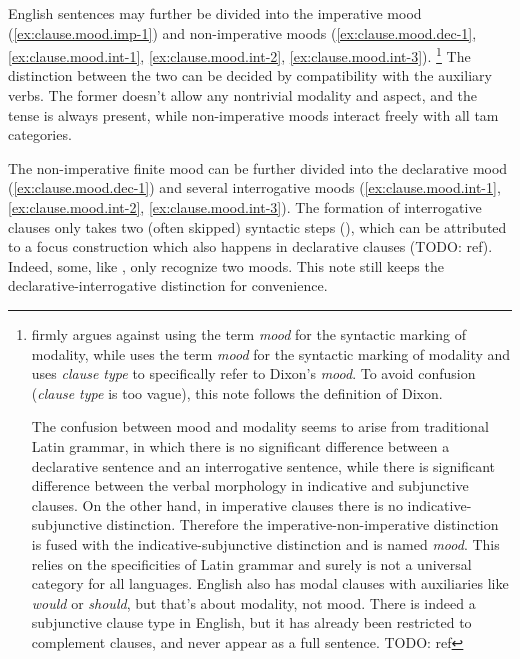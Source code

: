 \documentclass[UTF8, a4paper, oneside, scheme=plain, 12pt]{ctexbook}
\newcommand*{\citepage}[1]{p.~{#1}}
\newcommand*{\term}[1]{\emph{#1}}
\newcommand{\form}[1]{\emph{#1}}
\begin{document}
English sentences may further be divided into the imperative mood (\ref{ex:clause.mood.imp-1})
and non-imperative moods (\ref{ex:clause.mood.dec-1}, 
\ref{ex:clause.mood.int-1}, 
\ref{ex:clause.mood.int-2},
\ref{ex:clause.mood.int-3}).%
\footnote{
    \citet{dixon2009basic1} firmly argues against using the term \term{mood} 
    for the syntactic marking of modality,
    while \citet{cgel} uses the term \term{mood} for the syntactic marking of modality
    and uses \term{clause type} to specifically refer to Dixon's \term{mood}.
    To avoid confusion (\term{clause type} is too vague),
    this note follows the definition of Dixon.

    The confusion between mood and modality seems to arise from traditional Latin grammar,
    in which there is no significant difference 
    between a declarative sentence and an interrogative sentence, 
    while there is significant difference
    between the verbal morphology in indicative and subjunctive clauses.
    On the other hand, in imperative clauses 
    there is no indicative-subjunctive distinction.
    Therefore the imperative-non-imperative distinction is fused with 
    the indicative-subjunctive distinction 
    and is named \term{mood}.
    This relies on the specificities of Latin grammar 
    and surely is not a universal category for all languages.
    English also has modal clauses with auxiliaries like \form{would} or \form{should},
    but that's about modality, not mood.
    There is indeed a subjunctive clause type in English,
    but it has already been restricted to complement clauses,
    and never appear as a full sentence. TODO: ref
}
The distinction between the two can be decided by compatibility with the auxiliary verbs.
The former doesn't allow any nontrivial modality and aspect,
and the tense is always present,
while non-imperative moods interact freely with all \acs{tam} categories.

The non-imperative finite mood
can be further divided into the declarative mood (\ref{ex:clause.mood.dec-1})
and several interrogative moods (\ref{ex:clause.mood.int-1}, 
\ref{ex:clause.mood.int-2},
\ref{ex:clause.mood.int-3}).
The formation of interrogative clauses 
only takes two (often skipped) syntactic steps 
(),
which can be attributed to a focus construction which also happens in declarative clauses (TODO: ref).
Indeed, some, like \citet[\citepage{25}]{dixon2005semantic}, only recognize two moods.
This note still keeps the declarative-interrogative distinction 
for convenience.
\end{document}
